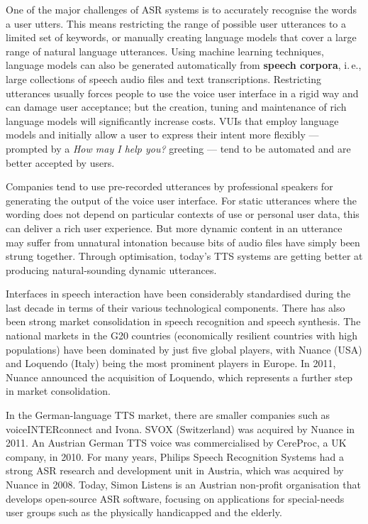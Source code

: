\documentclass[]{../../metanetpaper}
\begin{document}
\begin{multicols}{2}
One of the major challenges of ASR systems is to accurately recognise the words a user utters. This means restricting the range of possible user utterances to a limited set of keywords, or manually creating language models that cover a large range of natural language utterances. Using machine learning techniques, language models can also be generated automatically from \textbf{speech corpora}, i.\,e., large collections of speech audio files and text transcriptions. Restricting utterances usually forces people to use the voice user interface in a rigid way and can damage user acceptance; but the creation, tuning and maintenance of rich language models will significantly increase costs. VUIs that employ language models and initially allow a user to express their intent more flexibly — prompted by a \textit{How may I help you?} greeting — tend to be automated and are better accepted by users.


Companies tend to use pre-recorded utterances by professional speakers for generating the output of the voice user interface. For static utterances where the wording does not depend on particular contexts of use or personal user data, this can deliver a rich user experience. But more dynamic content in an utterance may suffer from unnatural intonation because bits of audio files have simply been strung together. Through optimisation, today’s TTS systems are getting better at producing natural-sounding dynamic utterances.

Interfaces in speech interaction have been considerably standardised during the last decade in terms of their various technological components. There has also been strong market consolidation in speech recognition and speech synthesis. The national markets in the G20 countries (economically resilient countries with high populations) have been dominated by just five global players, with Nuance (USA) and Loquendo (Italy) being the most prominent players in Europe. In 2011, Nuance announced the acquisition of Loquendo, which represents a further step in market consolidation.

In the German-language TTS market, there are smaller companies such as voiceINTERconnect and Ivona. SVOX (Switzerland) was acquired by Nuance in 2011. An Austrian German TTS voice was commercialised by CereProc, a UK company, in 2010. For many years, Philips Speech Recognition Systems had a strong ASR research and development unit in Austria, which was acquired by Nuance in 2008. Today, Simon Listens is an Austrian non-profit organisation that develops open-source ASR software, focusing on applications for special-needs user groups such as the physically handicapped and the elderly.


\end{multicols}
\end{document}
